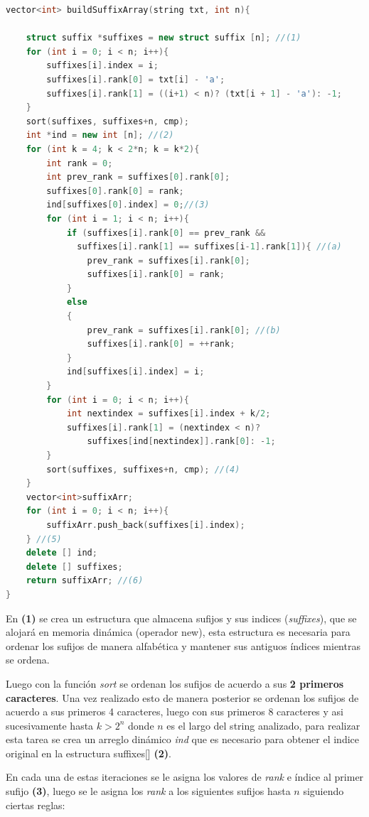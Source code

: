 \begin{lstlisting}[language=C++, caption=Función principal arreglo de sufijos (1)]
vector<int> buildSuffixArray(string txt, int n){

	struct suffix *suffixes = new struct suffix [n]; //(1)
	for (int i = 0; i < n; i++){
		suffixes[i].index = i;
		suffixes[i].rank[0] = txt[i] - 'a';
		suffixes[i].rank[1] = ((i+1) < n)? (txt[i + 1] - 'a'): -1;
	}
	sort(suffixes, suffixes+n, cmp); 
	int *ind = new int [n]; //(2)
	for (int k = 4; k < 2*n; k = k*2){
		int rank = 0;
		int prev_rank = suffixes[0].rank[0];
		suffixes[0].rank[0] = rank;
		ind[suffixes[0].index] = 0;//(3)
		for (int i = 1; i < n; i++){
			if (suffixes[i].rank[0] == prev_rank && 
			  suffixes[i].rank[1] == suffixes[i-1].rank[1]){ //(a)
				prev_rank = suffixes[i].rank[0];
				suffixes[i].rank[0] = rank;
			}
			else
			{
				prev_rank = suffixes[i].rank[0]; //(b)
				suffixes[i].rank[0] = ++rank;
			}
			ind[suffixes[i].index] = i;
		}
		for (int i = 0; i < n; i++){
			int nextindex = suffixes[i].index + k/2;
			suffixes[i].rank[1] = (nextindex < n)?
			    suffixes[ind[nextindex]].rank[0]: -1;
		}
		sort(suffixes, suffixes+n, cmp); //(4)
	}
	vector<int>suffixArr;
	for (int i = 0; i < n; i++){
        suffixArr.push_back(suffixes[i].index);
    } //(5)
	delete [] ind;
	delete [] suffixes;
	return suffixArr; //(6)
}

\end{lstlisting}

En \textbf{(1)} se crea un estructura que almacena sufijos y sus indices (\textit{suffixes}), que se alojará en memoria dinámica (operador new), esta estructura es necesaria para ordenar los sufijos de manera alfabética y mantener sus antiguos índices mientras se ordena. 

Luego con la función \textit{sort} se ordenan los sufijos de acuerdo a sus \textbf{2 primeros caracteres}. Una vez realizado esto de manera posterior se ordenan los sufijos de acuerdo a sus primeros 4 caracteres, luego con sus primeros 8 caracteres y asi sucesivamente hasta $k > 2^{n}$ donde $n$ es el largo del string analizado, para realizar esta tarea se crea un arreglo dinámico \textit{ind} que es necesario para obtener el indice original en la estructura suffixes[] \textbf{(2)}.

En cada una de estas iteraciones se le asigna los valores de \textit{rank} e índice al primer sufijo \textbf{(3)}, luego se le asigna los \textit{rank} a los siguientes sufijos hasta $n$ siguiendo ciertas reglas:

